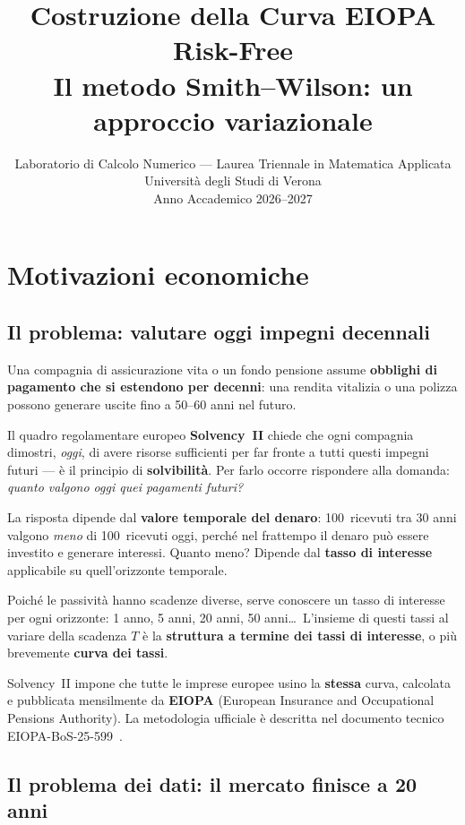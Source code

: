 \documentclass[11pt,a4paper]{article}
\title{%
  \textbf{Costruzione della Curva EIOPA Risk-Free}\\[6pt]
  \large Il metodo Smith--Wilson: un approccio variazionale\\[4pt]
}
\author{Laboratorio di Calcolo Numerico --- Laurea Triennale in Matematica Applicata\\
  Universit\`a degli Studi di Verona\\[2pt]
  Anno Accademico 2026--2027}
\date{}
\theoremstyle{plain}
\theoremstyle{definition}
\theoremstyle{remark}
\begin{document}
\maketitle
\tableofcontents
\newpage

\section{Motivazioni economiche}

\subsection{Il problema: valutare oggi impegni decennali}

Una compagnia di assicurazione vita o un fondo pensione assume \textbf{obblighi di pagamento
che si estendono per decenni}: una rendita vitalizia o una polizza possono generare uscite
fino a 50--60 anni nel futuro.

Il quadro regolamentare europeo \textbf{Solvency~II} chiede che ogni compagnia dimostri,
\emph{oggi}, di avere risorse sufficienti per far fronte a tutti questi impegni futuri ---
\`e il principio di \textbf{solvibilit\`a}. Per farlo occorre rispondere alla domanda:
\emph{quanto valgono oggi quei pagamenti futuri?}

La risposta dipende dal \textbf{valore temporale del denaro}: 100\,\texteuro{} ricevuti tra
30 anni valgono \emph{meno} di 100\,\texteuro{} ricevuti oggi, perch\'e nel frattempo il
denaro pu\`o essere investito e generare interessi. Quanto meno? Dipende dal
\textbf{tasso di interesse} applicabile su quell'orizzonte temporale.

Poich\'e le passivit\`a hanno scadenze diverse, serve conoscere un tasso di interesse per
ogni orizzonte: 1 anno, 5 anni, 20 anni, 50 anni\ldots\ L'insieme di questi tassi al
variare della scadenza $T$ \`e la \textbf{struttura a termine dei tassi di interesse}, o
pi\`u brevemente \textbf{curva dei tassi}.

Solvency~II impone che tutte le imprese europee usino la \textbf{stessa} curva, calcolata e
pubblicata mensilmente da \textbf{EIOPA} (European Insurance and Occupational Pensions
Authority). La metodologia ufficiale \`e descritta nel documento tecnico
EIOPA-BoS-25-599~\cite{eiopa2025}.

\subsection{Il problema dei dati: il mercato finisce a 20 anni}
\end{document}
